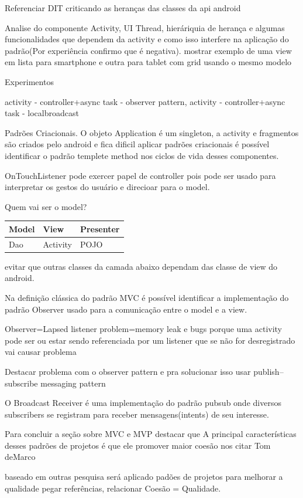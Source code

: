 

\if
Referenciar DIT criticando as heranças das classes da api android

Analise do componente Activity, UI Thread, hieráriquia de herança e algumas
funcionalidades que dependem da activity e como isso interfere na aplicação do
padrão(Por experiência confirmo que é negativa). mostrar exemplo de uma view em
lista para smartphone e outra para tablet com grid usando o mesmo modelo


Experimentos


activity - controller+async task - observer pattern,
activity - controller+async task - localbroadcast

Padrões Criacionais. O objeto Application é um singleton, a activity e
fragmentos são criados pelo android e fica dificil aplicar padrões criacionais é
possível identificar o padrão templete method nos ciclos de vida desses
componentes.



OnTouchListener pode exercer papel de controller pois
pode ser usado para interpretar os gestos do usuário e direcioar para o model.


Quem vai ser o model?

\begin{center}
\begin{tabular}{ | l | l | l | }
  \hline                        
  	Model & View & Presenter \\  \hline
  	Dao & Activity & POJO \\  \hline
\end{tabular}
\end{center}





evitar que outras classes da camada abaixo dependam das classe de view do
android.

Na definição clássica do padrão MVC é possível identificar a implementação do
padrão Observer usado para a comunicação entre o model e a view.



Observer=Lapsed listener problem=memory leak e bugs porque uma activity pode ser
ou estar sendo referenciada por um listener que se não for desregistrado vai
causar problema

Destacar problema com o observer pattern e pra solucionar isso
usar publish–subscribe messaging pattern

O Broadcast Receiver é uma implementação do padrão pubsub onde diversos
subscribers se registram para receber mensagens(intents) de seu interesse.
\fi





 Para concluir a seção sobre MVC e MVP destacar que A principal características
 desses padrões de projetos é que ele promover maior coesão nos citar Tom deMarco 

baseado em outras pesquisa será aplicado padões de projetos  para melhorar a
 qualidade pegar referências,  relacionar Coesão = Qualidade.


